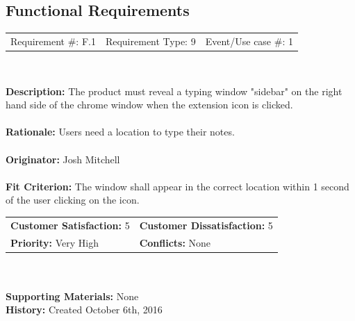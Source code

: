 \documentclass[12pt, titlepage]{article}
\begin{document}
\subsection{Functional Requirements}
\begin{framed}
	
	\begin{center}
		
		\begin{tabular}{ l c r }
			Requirement \#: F.1 & Requirement Type: 9 & Event/Use case \#: 1\\
		\end{tabular} \\
	\end{center}
	\textbf{Description:} The product must reveal a typing window "sidebar" on 
	the right hand side of the chrome window when the extension icon is 
	clicked. \\
	\\
	\textbf{Rationale:} Users need a location to type their notes. \\
	\\
	\textbf{Originator:} Josh Mitchell \\
	\\
	\textbf{Fit Criterion:} The window shall appear in the correct location 
	within 1 second of the user clicking on the icon. \\
	
	\begin{tabular}{ll}
		\textbf{Customer Satisfaction:} 5 & \textbf{Customer Dissatisfaction:} 5 \\
		\textbf{Priority:} Very High & \textbf{Conflicts:} None\\
	\end{tabular} \\
	\\
	\textbf{Supporting Materials:} None \\
	\textbf{History:} Created October 6th, 2016
	
\end{framed}
\end{document}
